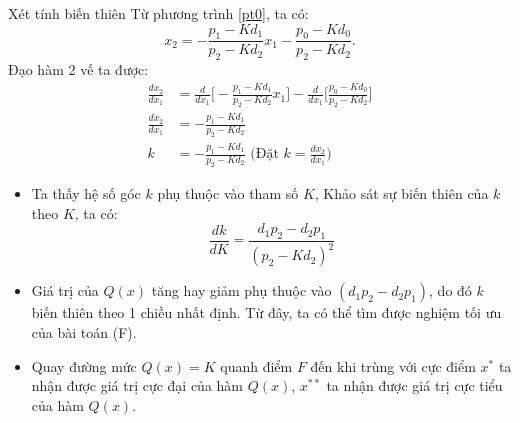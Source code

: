 \documentclass{beamer}
\begin{document}
\begin{frame}{Xét tính biến thiên} \large
Từ phương trình \eqref{pt0}, ta có:
\begin{equation}
x_2=-\frac{p_1-Kd_1}{p_2-Kd_2}x_1-\frac{p_0-Kd_0}{p_2-Kd_2}.
\end{equation}
Đạo hàm 2 vế ta được:
\begin{equation*}
\begin{split}
    \frac{dx_2}{dx_1} &= \frac{d}{dx_1} \Bigg[-\frac{p_1-Kd_1}{p_2-Kd_2}x_1\Bigg] - \frac{d}{dx_1} \Bigg[\frac{p_0-Kd_0}{p_2-Kd_2} \Bigg] \\
    \frac{dx_2}{dx_1} &= -\frac{p_1-Kd_1}{p_2-Kd_2} \\
    k &= -\frac{p_1-Kd_1}{p_2-Kd_2} \text{    (Đặt $k=\frac{dx_2}{dx_1}$)}
\end{split} 
\end{equation*}
\end{frame}

\begin{frame} \large
\begin{itemize}
\item Ta thấy hệ số góc $k$ phụ thuộc vào tham số $K$, Khảo sát sự biến thiên của $k$ theo $K$, ta có:
\begin{equation}
\frac{dk}{dK}=\frac{d_1p_2-d_2p_1}{(p_2-Kd_2)^2}
\end{equation}
\item Giá trị của $Q(x)$ tăng hay giảm phụ thuộc vào $(d_1p_2-d_2p_1)$, do đó $k$ biến thiên theo 1 chiều nhất định. Từ đây, ta có thể tìm được nghiệm tối ưu của bài toán (F).
\item Quay đường mức $Q(x)=K$ quanh điểm $F$ đến khi trùng với cực điểm $x^*$ ta nhận được giá trị cực đại của hàm $Q(x)$, $x^{**}$ ta nhận được giá trị cực tiểu của hàm $Q(x)$. 
\end{itemize}
\end{frame}
\end{document}
